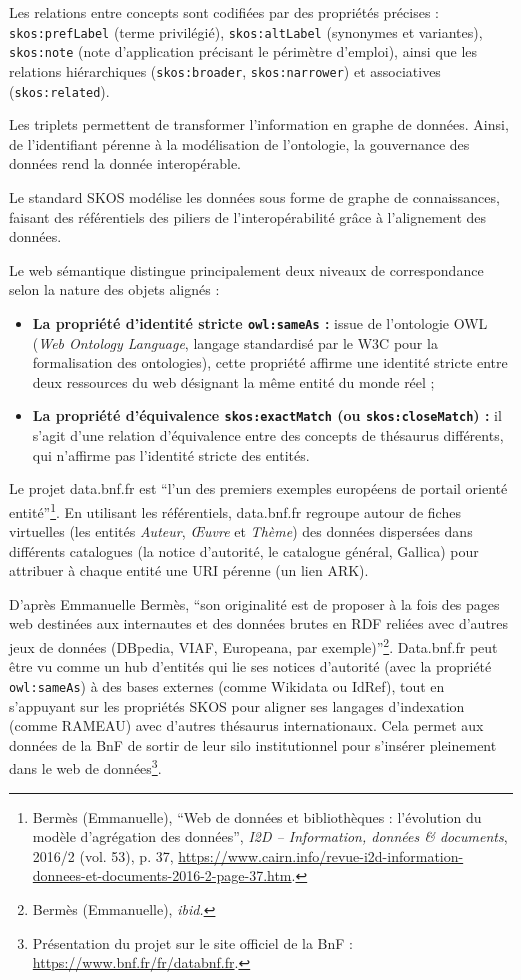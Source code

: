 Les relations entre concepts sont codifiées par des propriétés précises : \texttt{skos:prefLabel} (terme privilégié), \texttt{skos:altLabel} (synonymes et variantes), \texttt{skos:note} (note d'application précisant le périmètre d'emploi), ainsi que les relations hiérarchiques (\texttt{skos:broader}, \texttt{skos:narrower}) et associatives (\texttt{skos:related}).

Les triplets permettent de transformer l'information en graphe de données. Ainsi, de l'identifiant pérenne à la modélisation de l'ontologie, la gouvernance des données rend la donnée interopérable.

Le standard SKOS modélise les données sous forme de graphe de connaissances, faisant des référentiels des piliers de l’interopérabilité grâce à l’alignement des données.

Le web sémantique distingue principalement deux niveaux de correspondance selon la nature des objets alignés :

\begin{itemize}
	\item \textbf{La propriété d’identité stricte \texttt{owl:sameAs} :} issue de l'ontologie OWL (\textit{Web Ontology Language}, langage standardisé par le W3C pour la formalisation des ontologies), cette propriété affirme une identité stricte entre deux ressources du web désignant la même entité du monde réel ;
	\item \textbf{La propriété d’équivalence \texttt{skos:exactMatch} (ou \texttt{skos:closeMatch}) :} il s’agit d’une relation d’équivalence entre des concepts de thésaurus différents, qui n’affirme pas l’identité stricte des entités.
\end{itemize}

Le projet data.bnf.fr est \enquote{l’un des premiers exemples européens de portail orienté entité}\footnote{Bermès (Emmanuelle), \enquote{Web de données et bibliothèques : l’évolution du modèle d’agrégation des données}, \textit{I2D – Information, données \& documents}, 2016/2 (vol. 53), p. 37, \url{https://www.cairn.info/revue-i2d-information-donnees-et-documents-2016-2-page-37.htm}.}. En utilisant les référentiels, data.bnf.fr regroupe autour de fiches virtuelles (les entités \textit{Auteur}, \textit{Œuvre} et \textit{Thème}) des données dispersées dans différents catalogues (la notice d’autorité, le catalogue général, Gallica) pour attribuer à chaque entité une URI pérenne (un lien ARK).

D’après Emmanuelle Bermès, \enquote{son originalité est de proposer à la fois des pages web destinées aux internautes et des données brutes en RDF reliées avec d’autres jeux de données (DBpedia, VIAF, Europeana, par exemple)}\footnote{Bermès (Emmanuelle), \textit{ibid.}}. Data.bnf.fr peut être vu comme un hub d'entités qui lie ses notices d'autorité (avec la propriété \texttt{owl:sameAs}) à des bases externes (comme Wikidata ou IdRef), tout en s'appuyant sur les propriétés SKOS pour aligner ses langages d'indexation (comme RAMEAU) avec d'autres thésaurus internationaux. Cela permet aux données de la BnF de sortir de leur silo institutionnel pour s'insérer pleinement dans le web de données\footnote{Présentation du projet sur le site officiel de la BnF : \url{https://www.bnf.fr/fr/databnf.fr}.}.

